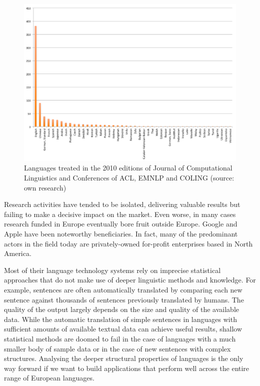 \documentclass[10pt, plain]{../../metanetpaper}
\begin{document}
\begin{multicols}{2}
\begin{figure}[htb]
  \center
  \includegraphics[width=\textwidth]{images/Languages-in-LT-Research}
  \caption{Languages treated in the 2010 editions of Journal of Computational Linguistics and Conferences of ACL, EMNLP and COLING (source: own research)}
  \label{fig:languages-in-research}
\end{figure}

Research activities have tended to be isolated, delivering valuable results but failing to make a decisive impact on the market. Even worse, in many cases research funded in Europe eventually bore fruit outside Europe. Google and Apple have been noteworthy beneficiaries. In fact, many of the predominant actors in the field today are privately-owned for-profit enterprises based in North America.

Most of their language technology systems rely on imprecise statistical approaches that do not make use of deeper linguistic methods and knowledge. For example, sentences are often automatically translated by comparing each new sentence against thousands of sentences previously translated by humans. The quality of the output largely depends on the size and quality of the available data. While the automatic translation of simple sentences in languages with sufficient amounts of available textual data can achieve useful results, shallow statistical methods are doomed to fail in the case of languages with a much smaller body of sample data or in the case of new sentences with complex structures. Analysing the deeper structural properties of languages is the only way forward if we want to build applications that perform well across the entire range of European languages.


\end{multicols}
\end{document}
